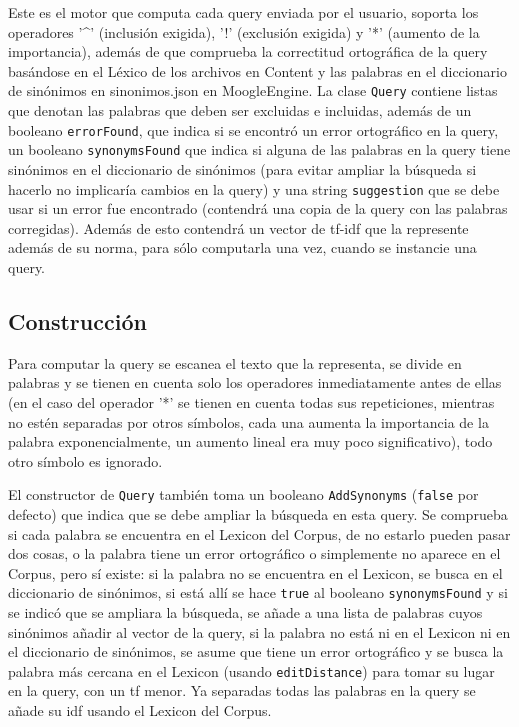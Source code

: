 \documentclass[a4paper, 12pt]{article}
\begin{document}
Este es el motor que computa cada query enviada por el usuario, soporta
los operadores '\^{}' (inclusión exigida), '!' (exclusión exigida) y '*' (aumento de la
importancia), además de que comprueba la correctitud ortográfica de la query
basándose en el Léxico de los archivos en Content y las palabras en el
diccionario de sinónimos en sinonimos.json en MoogleEngine.
La clase \texttt{Query} contiene listas que denotan las palabras que deben ser
excluidas e incluidas, además de un booleano \texttt{errorFound}, que indica si se
encontró un error ortográfico en la query, un booleano \texttt{synonymsFound} que
indica si alguna de las palabras en la query tiene sinónimos en el diccionario de
sinónimos (para evitar ampliar la búsqueda si hacerlo no implicaría cambios en
la query) y una string \texttt{suggestion} que se debe usar si un error fue encontrado
(contendrá una copia de la query con las palabras corregidas). Además de esto
contendrá un vector de tf-idf que la represente además de su norma, para sólo
computarla una vez, cuando se instancie una query.

\subsection{Construcción}

Para computar la query se escanea el texto que la representa, se divide
en palabras y se tienen en cuenta solo los operadores inmediatamente antes de
ellas (en el caso del operador '*' se tienen en cuenta todas sus repeticiones,
mientras no estén separadas por otros símbolos, cada una aumenta la importancia de
la palabra exponencialmente, un aumento lineal era muy poco significativo), todo otro símbolo es ignorado.

El constructor de \texttt{Query} también toma un booleano \texttt{AddSynonyms} (\texttt{false} por
defecto) que indica que se debe ampliar la búsqueda en esta query. Se
comprueba si cada palabra se encuentra en el Lexicon del Corpus, de no estarlo
pueden pasar dos cosas, o la palabra tiene un error ortográfico o simplemente no
aparece en el Corpus, pero sí existe: si la palabra no se encuentra en el Lexicon,
se busca en el diccionario de sinónimos, si está allí se hace \texttt{true} al booleano
\texttt{synonymsFound} y si se indicó que se ampliara la búsqueda, se añade a una lista
de palabras cuyos sinónimos añadir al vector de la query, si la palabra no está ni
en el Lexicon ni en el diccionario de sinónimos, se asume que tiene un error
ortográfico y se busca la palabra más cercana en el Lexicon (usando
\texttt{editDistance}) para tomar su lugar en la query, con un tf menor. Ya separadas
todas las palabras en la query se añade su idf usando el Lexicon del Corpus.
\end{document}
